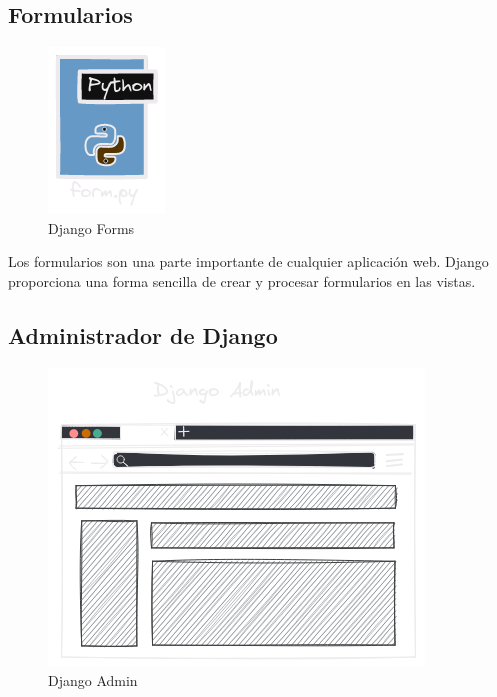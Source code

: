 \documentclass[
  a4paper,
  DIV=11,
  numbers=noendperiod,
  onepage,
  openany]{scrreprt}
\begin{document}
\begin{tcolorbox}
\subsection{Formularios}\label{formularios}

\begin{figure}[H]

{\centering \includegraphics{images/python-form.png}

}

\caption{Django Forms}

\end{figure}%

Los formularios son una parte importante de cualquier aplicación web.
Django proporciona una forma sencilla de crear y procesar formularios en
las vistas.

\subsection{Administrador de Django}\label{administrador-de-django}

\begin{figure}[H]

{\centering \includegraphics{images/django-admin.png}

}

\caption{Django Admin}


\end{figure}
\end{tcolorbox}
\end{document}
